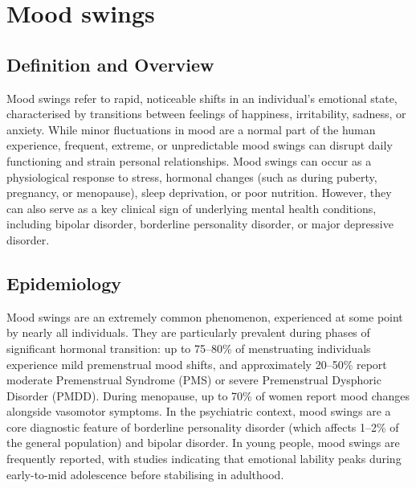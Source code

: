 \chapter{Mood swings}

\section*{Definition and Overview}
Mood swings refer to rapid, noticeable shifts in an individual's emotional state, characterised by transitions between feelings of happiness, irritability, sadness, or anxiety. While minor fluctuations in mood are a normal part of the human experience, frequent, extreme, or unpredictable mood swings can disrupt daily functioning and strain personal relationships. Mood swings can occur as a physiological response to stress, hormonal changes (such as during puberty, pregnancy, or menopause), sleep deprivation, or poor nutrition. However, they can also serve as a key clinical sign of underlying mental health conditions, including bipolar disorder, borderline personality disorder, or major depressive disorder.

\section*{Epidemiology}
Mood swings are an extremely common phenomenon, experienced at some point by nearly all individuals. They are particularly prevalent during phases of significant hormonal transition: up to 75--80\% of menstruating individuals experience mild premenstrual mood shifts, and approximately 20--50\% report moderate Premenstrual Syndrome (PMS) or severe Premenstrual Dysphoric Disorder (PMDD). During menopause, up to 70\% of women report mood changes alongside vasomotor symptoms. In the psychiatric context, mood swings are a core diagnostic feature of borderline personality disorder (which affects 1--2\% of the general population) and bipolar disorder. In young people, mood swings are frequently reported, with studies indicating that emotional lability peaks during early-to-mid adolescence before stabilising in adulthood.

